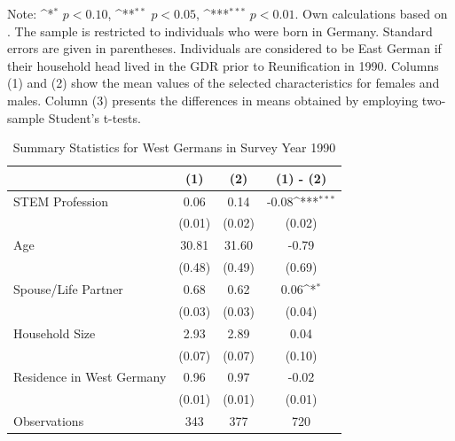 \documentclass[a4paper, oneside, hyperfootnotes = false]{article}
\def\sym#1{\ifmmode^{#1}\else\(^{#1}\)\fi}
\begin{document}
{\begin{table}[ht]
\begin{center}
		\vspace{2mm}
		
		\parbox{10cm}{
			\linespread{1}\footnotesize Note: \sym{*} \(p<0.10\), \sym{**} \(p<0.05\), \sym{***} \(p<0.01\). Own calculations based on \cite{SOEP2023}. The sample is restricted to individuals who were born in Germany. Standard errors are given in parentheses. Individuals are considered to be East German if their household head lived in the GDR prior to Reunification in 1990. Columns (1) and (2) show the mean values of the selected characteristics for females and males. Column (3) presents the differences in means obtained by employing two-sample Student's t-tests.}
		
	\end{center}
\end{table}

\begin{table}[ht]
	\caption{Summary Statistics for West Germans in Survey Year 1990}
	\label{tab:descr_summary_west}
	\begin{center}
		\begin{tabular}{l*{3}{c}}
			\toprule
			& (1) & (2) & (1) - (2) \\
			\midrule
			STEM Profession & 0.06  & 0.14 &  -0.08\sym{***}      \\
			&   (0.01)  & (0.02) & (0.02) \\
			\addlinespace
			Age         & 30.81     &  31.60   &    -0.79     \\
			&     (0.48) &        (0.49)         &      (0.69) \\
			\addlinespace
			Spouse/Life Partner & 0.68       &  0.62   &     0.06\sym{*}      \\
			&      (0.03)&          (0.03)&         (0.04) \\
			\addlinespace
			Household Size      &  2.93   &  2.89   &    0.04       \\
			&          (0.07)&       (0.07)        &      (0.10)\\
			\addlinespace
			Residence in West Germany& 0.96    &  0.97   &    -0.02        \\
			&         (0.01) &       (0.01)&  (0.01)\\
			\midrule
			Observations        &        343 &     377     &       720                \\
			\bottomrule
		\end{tabular}
		
		\vspace{2mm}
		

\end{center}
\end{table}}
\end{document}
